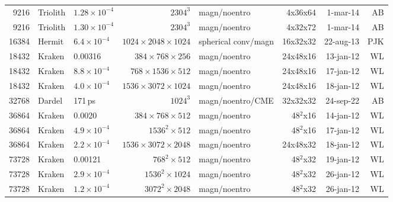 \documentclass[\mydriver,12pt,twoside,notitlepage,a4paper]{article}
\newcommand{\ps}{\,{\rm ps}}
\begin{document}
\begin{center}
\begin{footnotesize}
\begin{longtable}{rllrlrrr}
9216&Triolith&$1.28{\!\times\!}10^{-4}$&$2304^3$&magn/noentro&4x36x64& 1-mar-14 & AB \\
9216&Triolith&$1.30{\!\times\!}10^{-4}$&$2304^3$&magn/noentro&4x32x72& 1-mar-14 & AB \\
16384&Hermit&$6.4{\!\times\!}10^{-4}$&$1024{\!\times\!}2048{\!\times\!}1024$&spherical conv/magn&16x32x32&22-aug-13&PJK\\
18432 & Kraken& 0.00316  &$384{\!\times\!}768{\!\times\!}256$ & magn/noentro & 24x48x16 &13-jan-12 & WL\\
18432 & Kraken&$8.8{\!\times\!}10^{-4}$  &$768{\!\times\!}1536{\!\times\!}512$ & magn/noentro & 24x48x16 &17-jan-12 & WL\\
18432 & Kraken& $4.0{\!\times\!}10^{-4}$ &$1536{\!\times\!}3072{\!\times\!}1024$ & magn/noentro & 24x48x16 &18-jan-12 & WL\\
32768 & Dardel &$ $171\ps$ $&$1024^3$ & magn/noentro/CME & 32x32x32  & 24-sep-22 & AB \\
36864 & Kraken& 0.0020  &$384{\!\times\!}768{\!\times\!}512$ & magn/noentro & 48$^2$x16 &14-jan-12 & WL\\
36864 & Kraken& $4.9{\!\times\!}10^{-4}$  &$1536^2{\!\times\!}512$ & magn/noentro & 48$^2$x16 &17-jan-12 & WL\\
36864 & Kraken& $2.2{\!\times\!}10^{-4}$  &$1536{\!\times\!}3072{\!\times\!}2048$ & magn/noentro & 24x48x32 &18-jan-12 & WL\\
73728 & Kraken& 0.00121  &$768^2{\!\times\!}512$ & magn/noentro & 48$^2$x32 &19-jan-12 & WL\\
73728 & Kraken& $2.9{\!\times\!}10^{-4}$ &$1536^2{\!\times\!}1024$ & magn/noentro & 48$^2$x32 &26-jan-12 & WL\\
73728 & Kraken& $1.2{\!\times\!}10^{-4}$  &$3072^2{\!\times\!}2048$ & magn/noentro & 48$^2$x32 &26-jan-12 & WL\\
\bottomrule
  \end{longtable}
    \end{footnotesize}
  \end{center}
\normalsize
\end{document}
